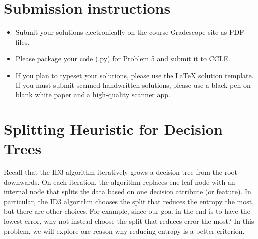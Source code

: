 \documentclass[11pt]{article}
\begin{document}
\author{}
\date{}
\vspace{-1in}
\maketitle
\vspace{-0.75in}






\section*{Submission instructions}
\begin{itemize}
\item 
Submit your solutions electronically on the course Gradescope site as PDF files.
\item Please package your code (.py) for Problem 5 and submit it to CCLE.
\item If you plan to typeset your solutions, please use the LaTeX solution template. If you must submit scanned handwritten solutions, please use a black pen on blank white paper and a high-quality scanner app.
\end{itemize}

\clearpage

\section{Splitting Heuristic for Decision Trees }
Recall that the ID3 algorithm iteratively grows a decision tree from the root downwards. On each iteration, the algorithm replaces one leaf node with an internal node that splits the data based on one decision attribute (or feature). In particular, the ID3 algorithm chooses the split that reduces the entropy the most, but there are other choices. For example, since our goal in the end is to have the lowest error, why not instead choose the split that reduces error the most? In this problem, we will explore one reason why reducing entropy is a better criterion.
\end{document}
